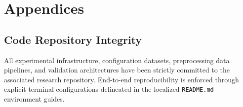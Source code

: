 \documentclass{rapportECL}
\begin{document}
\section{Appendices}

\subsection{Code Repository Integrity}
All experimental infrastructure, configuration datasets, preprocessing data pipelines, and validation architectures have been strictly committed to the associated research repository. End-to-end reproducibility is enforced through explicit terminal configurations delineated in the localized \texttt{README.md} environment guides.
\end{document}
